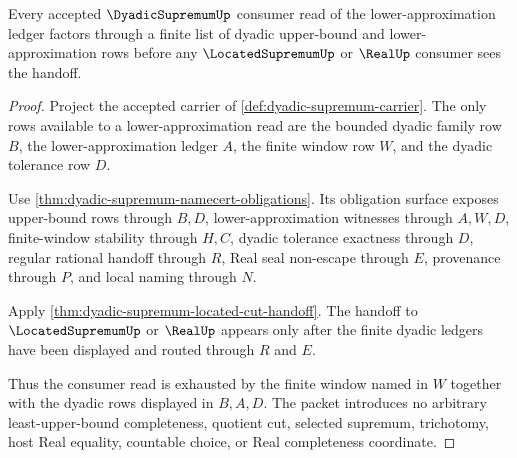 \begin{theorem}
\label{thm:dyadic-supremum-finite-window-exhaustion}
Every accepted $\DyadicSupremumUp$ consumer read of the lower-approximation ledger factors through a finite list of dyadic upper-bound and lower-approximation rows before any $\LocatedSupremumUp$ or $\RealUp$ consumer sees the handoff.
\end{theorem}
\begin{proof}
Project the accepted carrier of \autoref{def:dyadic-supremum-carrier}. The only rows available to a lower-approximation read are the bounded dyadic family row $B$, the lower-approximation ledger $A$, the finite window row $W$, and the dyadic tolerance row $D$.

Use \autoref{thm:dyadic-supremum-namecert-obligations}. Its obligation surface exposes upper-bound rows through $B,D$, lower-approximation witnesses through $A,W,D$, finite-window stability through $H,C$, dyadic tolerance exactness through $D$, regular rational handoff through $R$, Real seal non-escape through $E$, provenance through $P$, and local naming through $N$.

Apply \autoref{thm:dyadic-supremum-located-cut-handoff}. The handoff to $\LocatedSupremumUp$ or $\RealUp$ appears only after the finite dyadic ledgers have been displayed and routed through $R$ and $E$.

Thus the consumer read is exhausted by the finite window named in $W$ together with the dyadic rows displayed in $B,A,D$. The packet introduces no arbitrary least-upper-bound completeness, quotient cut, selected supremum, trichotomy, host Real equality, countable choice, or Real completeness coordinate.
\end{proof}



